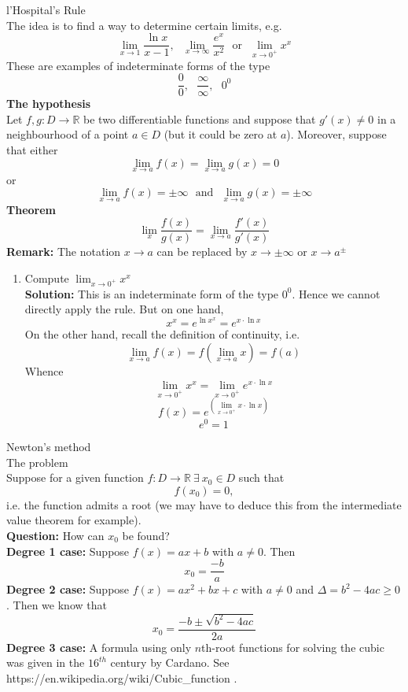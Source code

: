 \documentclass[]{article}
\begin{document}
	\Large{l'Hospital's Rule}\\
	\normalsize
	The idea is to find a way to determine certain limits, e.g.
	$$
		\lim_{x\to 1}\frac{\ln x}{x-1},~~~\lim_{x\to\infty}\frac{e^x}{x^2}~~~\text{or}~~~\lim_{x\to 0^+}x^x
	$$
	These are examples of indeterminate forms of the type
	$$
		\frac{0}0,~~~\frac{\infty}\infty,~~~0^0
	$$
	{\bf The hypothesis}\\
	Let $f,g:D\rightarrow\mathbb{R}$ be two differentiable functions and suppose that $g'(x)\ne 0$ in a neighbourhood of a point $a\in D$ (but it could be zero at $a$). Moreover, suppose that either
	$$
		\lim_{x\to a}f(x)=\lim_{x\to a}g(x)=0
	$$
	or
	$$
		\lim_{x\to a}f(x)=\pm\infty~~~\text{and}~~~\lim_{x\to a}g(x)=\pm\infty
	$$
	{\bf Theorem}
	$$
		\lim_{x}\frac{f(x)}{g(x)}=\lim_{x\to a}\frac{f'(x)}{g'(x)}
	$$
	{\bf Remark:} The notation $x\to a$ can be replaced by $x\to\pm\infty$ or $x\to a^{\pm}$\\
	\begin{enumerate}
		\item Compute $\lim_{x\to 0^+}x^x$\\
		{\bf Solution:} This is an indeterminate form of the type $0^0$. Hence we cannot directly apply the rule. But on one hand,
		$$
			x^x=e^{\ln x^x}=e^{x\cdot\ln x}
		$$
		On the other hand, recall the definition of continuity, i.e.
		$$
			\lim_{x\to a}f(x)=f\left(\lim_{x\to a}x\right)=f(a)
		$$
		Whence
		$$
			\lim_{x\to 0^+}x^x=\lim_{x\to 0^+}e^{x\cdot\ln x}
		$$
		$$
		f(x)=e^{\left(\lim_{x\to 0^+}x\cdot\ln x\right)}
		$$
		$$
			e^0=1
		$$
	\end{enumerate}\pagebreak
	\Large{Newton's method}\\
	\large{The problem}\\
	\normalsize Suppose for a given function $f:D\rightarrow\mathbb{R}~\exists~x_0\in D$ such that
	$$
		f(x_0)=0,
	$$
	i.e. the function admits a root (we may have to deduce this from the intermediate value theorem for example).\\
	{\bf Question:} How can $x_0$ be found?\\
	{\bf Degree 1 case:} Suppose $f(x)=ax+b$ with $a\ne 0$. Then
	$$
		x_0=\frac{-b}{a}
	$$
	{\bf Degree 2 case:} Suppose $f(x)=ax^2+bx+c$ with $a\ne 0$ and $\Delta=b^2-4ac\ge 0$. Then we know that
	$$
		x_0=\frac{-b\pm\sqrt{b^2-4ac}}{2a}
	$$
	{\bf Degree 3 case:} A formula using only $n$th-root functions for solving the cubic was given in the $16^{th}$ century by Cardano. See https://en.wikipedia.org/wiki/Cubic\_function .\\
\end{document}
